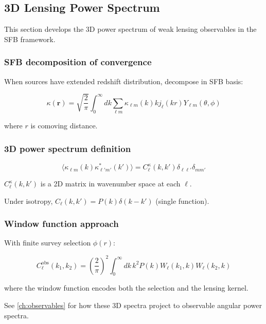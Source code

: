 \subsection{3D Lensing Power Spectrum}\label{subsec:wl_power_spectrum}

This section develops the 3D power spectrum of weak lensing observables in the SFB framework.

\subsubsection{SFB decomposition of convergence}

When sources have extended redshift distribution, decompose in SFB basis:

\begin{equation}
\kappa(\mathbf{r}) = \sqrt{\frac{2}{\pi}} \int_0^\infty dk \sum_{\ell m} \kappa_{\ell m}(k) k j_\ell(kr) Y_{\ell m}(\theta, \phi)
\end{equation}

where $r$ is comoving distance.

\subsubsection{3D power spectrum definition}

\begin{equation}
\langle \kappa_{\ell m}(k) \kappa^*_{\ell' m'}(k') \rangle = C_\ell^\kappa(k,k') \delta_{\ell\ell'} \delta_{mm'}
\end{equation}

$C_\ell^\kappa(k,k')$ is a 2D matrix in wavenumber space at each $\ell$.

Under isotropy, $C_\ell(k,k') = P(k) \delta(k-k')$ (single function).

\subsubsection{Window function approach}

With finite survey selection $\phi(r)$:

\begin{equation}
C^{\text{obs}}_\ell(k_1, k_2) = \left(\frac{2}{\pi}\right)^2 \int_0^\infty dk \, k^2 P(k) W_\ell(k_1, k) W_\ell(k_2, k)
\end{equation}

where the window function encodes both the selection and the lensing kernel.


See \cref{ch:observables} for how these 3D spectra project to observable angular power spectra.
